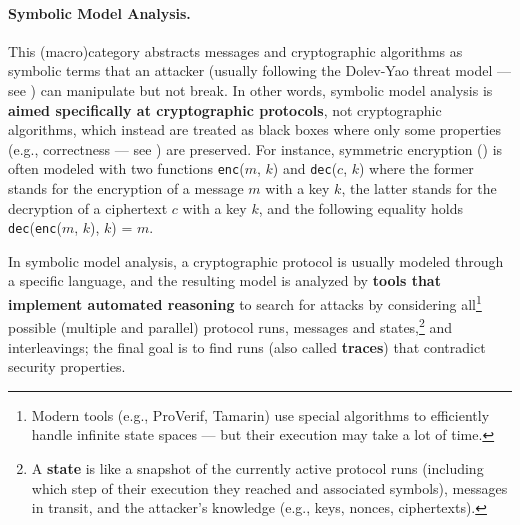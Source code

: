 \paragraph*{Symbolic Model Analysis.} This (macro)category abstracts messages and cryptographic algorithms as symbolic terms that an attacker (usually following the Dolev-Yao threat model --- see ) can manipulate but not break. In other words, symbolic model analysis is \textbf{aimed specifically at cryptographic protocols}, not cryptographic algorithms, which instead are treated as black boxes where only some properties (e.g., correctness --- see ) are preserved. For instance, symmetric encryption () is often modeled with two functions \texttt{enc}($m$, $k$) and \texttt{dec}($c$, $k$) where the former stands for the encryption of a message $m$ with a key $k$, the latter stands for the decryption of a ciphertext $c$ with a key $k$, and the following equality holds \texttt{dec}(\texttt{enc}($m$, $k$), $k$) = $m$. 


In symbolic model analysis, a cryptographic protocol is usually modeled through a specific language, and the resulting model is analyzed by \textbf{tools that implement automated reasoning} to search for attacks by considering all\footnote{Modern tools (e.g., ProVerif, Tamarin) use special algorithms to efficiently handle infinite state spaces --- but their execution may take a lot of time.} possible (multiple and parallel) protocol runs, messages and states,\footnote{A \textbf{state} is like a snapshot of the currently active protocol runs (including which step of their execution they reached and associated symbols), messages in transit, and the attacker's knowledge (e.g., keys, nonces, ciphertexts).} and interleavings; the final goal is to find runs (also called \textbf{traces}) that contradict security properties.

